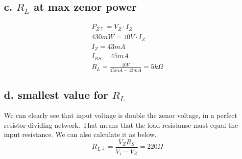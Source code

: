 \subsection*{c. $R_L$ at max zenor power}
\[
\begin{gathered}
    P_{Z\uparrow} = V_Z \cdot I_Z \\
    430mW = 10V \cdot I_Z \\
    I_Z = 43mA \\
    I_{RS} = 45mA \\
    R_L = \frac{10V}{45mA - 43mA} = 5k\Omega
\end{gathered}
\]

\subsection*{d. smallest value for $R_L$}
We can clearly see that input voltage is double the zenor voltage, in a perfect resistor dividing network. That means that the load resistanse must equal the input resistance. We can also calculate it as below.
\[
R_{L\downarrow} = \frac{V_Z R_S}{V_i - V_Z} = 220\Omega
\]